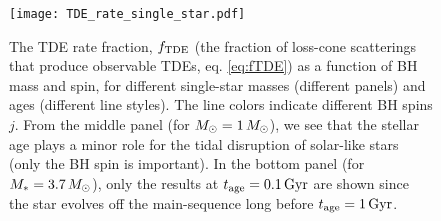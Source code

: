 \documentclass[useAMS,usenatbib]{mn2e}
\def\msun{M_{\rm \odot}}
\def\mstar{M_*}
\def\fTDE{f_{\rm TDE}}
\def\tage{t_{\rm age}}
\begin{document}



\begin{figure}
    \centering
    \texttt{[image: TDE\_rate\_single\_star.pdf]}
    \caption{
    The TDE rate fraction, $\fTDE$ (the fraction of loss-cone scatterings that produce observable TDEs, eq. \ref{eq:fTDE}) as a function of BH mass and spin, for different single-star masses (different panels) and ages (different line styles).
    The line colors indicate different BH spins $j$.
    From the middle panel (for $\msun=1\,\msun$), we see that the stellar age plays a minor role for the tidal disruption of solar-like stars (only the BH spin is important).
    In the bottom panel (for $\mstar=3.7\,\msun$), only the results at $t_{\rm age}=0.1\rm\, Gyr$ are shown since the star evolves off the main-sequence long before $t_{\rm age}=1\rm\, Gyr$.
    }
    \label{fig:TDE_rate_single_star}
\end{figure}
\end{document}
